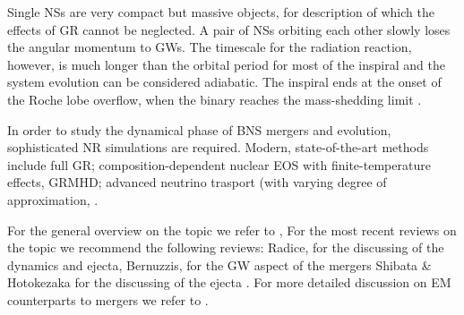 Single \acp{NS} are very compact but massive objects, 
for description of which the effects of \ac{GR} cannot be neglected.
A pair of \acp{NS} orbiting each other slowly loses the 
angular momentum to \acp{GW}. The timescale for the radiation reaction, however, 
is much longer than the orbital period for most of the inspiral and the 
system evolution can be considered adiabatic. 
The inspiral ends at the onset of the Roche lobe overflow, when the binary 
reaches the mass-shedding limit \cite{13}.

In order to study the dynamical phase of \ac{BNS} mergers and \pmerg{} evolution, 
sophisticated \ac{NR} simulations are required. Modern, state-of-the-art methods 
include full \ac{GR}; composition-dependent nuclear \ac{EOS} with finite-temperature 
effects, \ac{GRMHD}; advanced neutrino trasport (with varying degree of approximation,
\cite{14, 15, 16, 17, 18, 19, 20, 21}.


For the general overview on the topic we refer to \cite{22},
For the most recent reviews on the topic we recommend the following reviews:
Radice, for the discussing of the \pmerg{} dynamics and ejecta,
Bernuzzis, for the \ac{GW} aspect of the mergers \cite{Bernuzzi}
Shibata & Hotokezaka for the discussing of the ejecta \cite{Shibata & Hotokezaka}.
For more detailed discussion on \ac{EM} counterparts to mergers we refer to \cite{23,24,25}.



